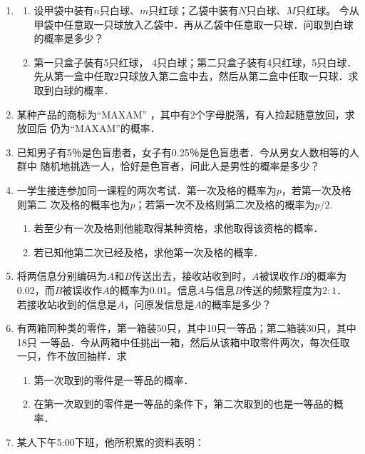 \documentclass[10pt,a4paper]{article}
\begin{document}
\begin{enumerate}
    \item \begin{enumerate}
        \item 设甲袋中装有$n$只白球、$m$只红球；乙袋中装有$N$只白球、$M$只红球。
        今从甲袋中任意取一只球放入乙袋中．再从乙袋中任意取一只球．问取到白球的概率是多少？
        \item 第一只盒子装有5只红球， 4只白球；第二只盒子装有4只红球，5只白球． 
        先从第一盒中任取2只球放入第二盒中去，然后从第二盒中任取一只球．求取到白球的概率．
    \end{enumerate}


    \item 某种产品的商标为“MAXAM” ，其中有2个字母脱落，有人捡起随意放回，求放回后
    仍为“MAXAM”的概率．


    \item 已知男子有5％是色盲患者，女子有0.25％是色盲患者．今从男女人数相等的人群中
    随机地挑选一人，恰好是色盲者，问此人是男性的概率是多少？

    
    \item 一学生接连参加同一课程的两次考试．第一次及格的概率为$p$，若第一次及格则第二
    次及格的概率也为$p$；若第一次不及格则第二次及格的概率为$p/2$.
    \begin{enumerate}
        \item 若至少有一次及格则他能取得某种资格，求他取得该资格的概率．
        \item 若已知他第二次已经及格，求他第一次及格的概率．
    \end{enumerate}




    \item 将两信息分别编码为$A$和$B$传送出去，接收站收到时，$A$被误收作$B$的概率为
    0.02，而$B$被误收作$A$的概率为0.01。信息$A$与信息$B$传送的频繁程度为$2:1$．
    若接收站收到的信息是$A$，问原发信息是$A$的概率是多少？


    \item 有两箱同种类的零件，第一箱装50只，其中10只一等品；第二箱装30只，其中18只
    一等品．今从两箱中任挑出一箱，然后从该箱中取零件两次，每次任取一只，作不放回抽样．求
    \begin{enumerate}
        \item 第一次取到的零件是一等品的概率．
        \item 在第一次取到的零件是一等品的条件下，第二次取到的也是一等品的概率．
    \end{enumerate}


    \item 某人下午5:00下班，他所积累的资料表明：
    

\end{enumerate}
\end{document}
